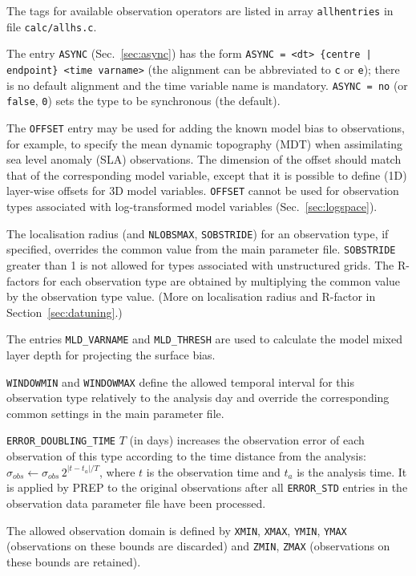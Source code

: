 \documentclass[11pt]{report}
\begin{document}
The tags for available observation operators are listed in array \verb|allhentries| in file \verb|calc/allhs.c|.

The entry \verb|ASYNC| (Sec.~\ref{sec:async}) has the form \verb!ASYNC = <dt> {centre | endpoint} <time varname>! (the alignment can be abbreviated to \verb|c| or \verb|e|); there is no default alignment and the time variable name is mandatory.
\verb|ASYNC = no| (or \verb|false|, \verb|0|) sets the type to be synchronous (the default).

The \verb|OFFSET| entry may be used for adding the known model bias to observations, for example, to specify the mean dynamic topography (MDT) when assimilating sea level anomaly (SLA) observations.
The dimension of the offset should match that of the corresponding model variable, except that it is possible to define (1D) layer-wise offsets for 3D model variables.
\verb|OFFSET| cannot be used for observation types associated with log-transformed model variables (Sec.~\ref{sec:logspace}).

The localisation radius (and \verb|NLOBSMAX|, \verb|SOBSTRIDE|) for an observation type, if specified, overrides the common value from the main parameter file.
\verb|SOBSTRIDE| greater than 1 is not allowed for types associated with unstructured grids.
The R-factors for each observation type are obtained by multiplying the common
value by the observation type value.
(More on localisation radius and R-factor in Section~\ref{sec:datuning}.)

The entries \verb|MLD_VARNAME| and \verb|MLD_THRESH| are used to calculate the model mixed layer depth for projecting the surface bias.

\verb|WINDOWMIN| and \verb|WINDOWMAX| define the allowed temporal interval for this observation type relatively to the analysis day and override the corresponding common settings in the main parameter file.

\verb|ERROR_DOUBLING_TIME| $T$ (in days) increases the observation error of each observation of this type according to the time distance from the analysis:
$\sigma_{obs} \leftarrow \sigma_{obs} \, 2^{|t - t_a| / T}$, where $t$ is the observation time and $t_a$ is the analysis time.
It is applied by PREP to the original observations after all \verb|ERROR_STD| entries in the observation data parameter file have been processed.

The allowed observation domain is defined by \verb|XMIN|, \verb|XMAX|, \verb|YMIN|, \verb|YMAX| (observations on these bounds are discarded) and \verb|ZMIN|, \verb|ZMAX| (observations on these bounds are retained).
\end{document}
